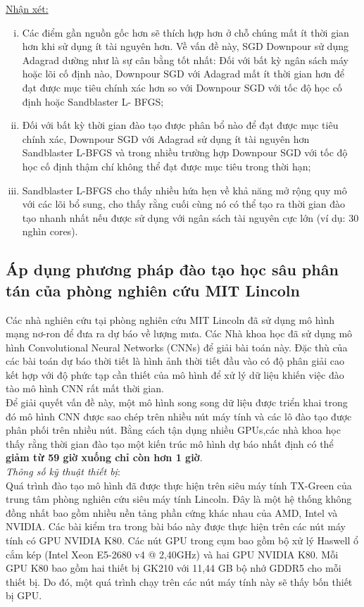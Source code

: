 \documentclass[11pt,a4paper]{article}
\numberwithin{equation}{subsection}
\numberwithin{figure}{subsection}
\numberwithin{table}{subsection}
\begin{document}
\underline{Nhận xét:} 
\begin{enumerate}[i. ]
	\item Các điểm gần nguồn gốc hơn sẽ thích hợp hơn ở chỗ chúng mất ít thời gian hơn khi sử dụng ít tài nguyên hơn. Về vấn đề này, SGD Downpour sử dụng Adagrad dường như là sự cân bằng tốt nhất: Đối với bất kỳ ngân sách máy hoặc lõi cố định nào, Downpour SGD với Adagrad mất ít thời gian hơn để đạt được mục tiêu chính xác hơn so với Downpour SGD với tốc độ học cố định hoặc Sandblaster L- BFGS;
	\item  Đối với bất kỳ thời gian đào tạo được phân bổ nào để đạt được mục tiêu chính xác, Downpour SGD với Adagrad sử dụng ít tài nguyên hơn Sandblaster L-BFGS và trong nhiều trường hợp Downpour SGD với tốc độ học cố định thậm chí không thể đạt được mục tiêu trong thời hạn;
	\item  Sandblaster L-BFGS cho thấy nhiều hứa hẹn về khả năng mở rộng quy mô với các lõi bổ sung, cho thấy rằng cuối cùng nó có thể tạo ra thời gian đào tạo nhanh nhất nếu được sử dụng với ngân sách tài nguyên cực lớn (ví dụ: 30 nghìn cores).
\end{enumerate}

\subsection{Áp dụng phương pháp đào tạo học sâu phân tán của phòng nghiên cứu MIT Lincoln}
Các nhà nghiên cứu tại phòng nghiên cứu MIT Lincoln đã sử dụng mô hình mạng nơ-ron để đưa ra dự báo về lượng mưa. Các Nhà khoa học đã sử dụng mô hình Convolutional Neural Networks (CNNs) để giải bài toán này. Đặc thù của các bài toán dự báo thời tiết là hình ảnh thời tiết đầu vào có độ phân giải cao kết hợp với độ phức tạp cần thiết của mô hình để xử lý dữ liệu khiến việc đào tào mô hình CNN rất mất thời gian.\\

Để giải quyết vấn đề này, một mô hình song song dữ liệu được triển khai trong đó mô hình CNN được sao chép trên nhiều nút máy tính và các lô đào tạo được phân phối trên nhiều nút. Bằng cách tận dụng nhiều GPUs,các nhà khoa học thấy rằng thời gian đào tạo một kiến trúc mô hình dự báo nhất định có thể \textbf{giảm từ 59 giờ xuống chỉ còn hơn 1 giờ}.\\

\textit{Thông số kỹ thuật thiết bị}: \\
Quá trình đào tạo mô hình đã được thực hiện trên siêu máy tính TX-Green của trung tâm phòng nghiên cứu siêu máy tính Lincoln. 
Đây là một hệ thống không đồng nhất bao gồm nhiều nền tảng phần cứng khác nhau của AMD, Intel và NVIDIA. Các bài kiểm tra trong bài báo này được thực hiện trên các nút máy tính có GPU NVIDIA K80. Các nút GPU trong cụm bao gồm bộ xử lý Haswell ổ cắm kép (Intel Xeon E5-2680 v4 @ 2,40GHz) và hai GPU NVIDIA K80. Mỗi GPU K80 bao gồm hai thiết bị GK210 với 11,44 GB bộ nhớ GDDR5 cho mỗi thiết bị. Do đó, một quá trình chạy trên các nút máy tính này sẽ thấy bốn thiết bị GPU.\\
\end{document}
